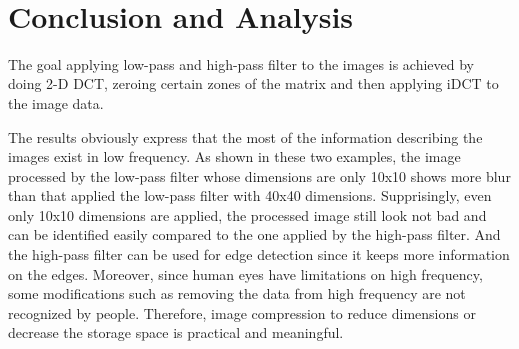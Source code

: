 \documentclass[11pt]{article}
\begin{document}
    \begin{center}
    \end{center}
    { \hspace*{\fill} \\}
    
    \hypertarget{conclusion-and-analysis}{%
\section{Conclusion and Analysis}\label{conclusion-and-analysis}}

    The goal applying low-pass and high-pass filter to the images is
achieved by doing 2-D DCT, zeroing certain zones of the matrix and then
applying iDCT to the image data.

The results obviously express that the most of the information
describing the images exist in low frequency. As shown in these two
examples, the image processed by the low-pass filter whose dimensions
are only 10x10 shows more blur than that applied the low-pass filter
with 40x40 dimensions. Supprisingly, even only 10x10 dimensions are
applied, the processed image still look not bad and can be identified
easily compared to the one applied by the high-pass filter. And the
high-pass filter can be used for edge detection since it keeps more
information on the edges. Moreover, since human eyes have limitations on
high frequency, some modifications such as removing the data from high
frequency are not recognized by people. Therefore, image compression to
reduce dimensions or decrease the storage space is practical and
meaningful.


    
    
    
    
\end{document}
